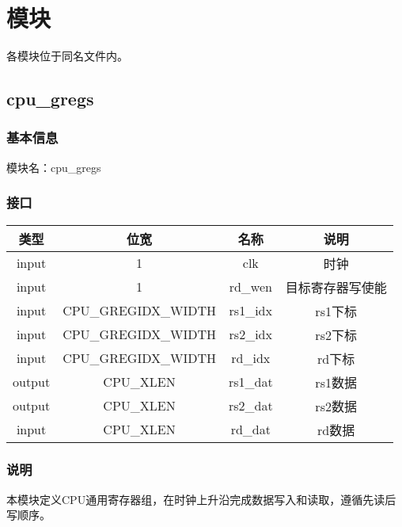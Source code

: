 %
% 
% 
% 
% 
% 
% 
%

\chapter{模块}
各模块位于同名文件内。
\section{cpu\_gregs}
\subsection{基本信息}
模块名：cpu\_gregs
\subsection{接口}
\begin{tabular}{|c|c|c|c|}
    \hline
    类型    &   位宽    &   名称    &   说明\\\hline
    input   &   1   &   clk &   时钟\\\hline
    input   &   1   &   rd\_wen  &   目标寄存器写使能\\\hline
    input   &   CPU\_GREGIDX\_WIDTH &   rs1\_idx    &   rs1下标\\\hline
    input   &   CPU\_GREGIDX\_WIDTH &   rs2\_idx    &   rs2下标\\\hline
    input   &   CPU\_GREGIDX\_WIDTH &   rd\_idx    &   rd下标\\\hline
    output   &   CPU\_XLEN &   rs1\_dat    &   rs1数据\\\hline
    output   &   CPU\_XLEN &   rs2\_dat    &   rs2数据\\\hline
    input   &   CPU\_XLEN &   rd\_dat    &   rd数据\\\hline
\end{tabular}
\subsection{说明}
本模块定义CPU通用寄存器组，在时钟上升沿完成数据写入和读取，遵循先读后写顺序。